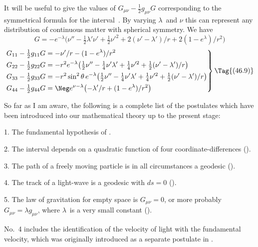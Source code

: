 \documentclass[12pt]{book}
\begin{document}
It will be useful to give the values of $G_{\mu\nu} - \frac{1}{2} g_{\mu\nu} G$ corresponding to the
symmetrical formula for the interval~. By varying $\lambda$~and $\nu$ this can represent
any distribution of continuous matter with spherical symmetry. We have
\[
G = -e^{-\lambda} \bigl(\nu'' - \tfrac{1}{2}\lambda'\nu' + \tfrac{1}{2}\nu'^{2} + 2(\nu' - \lambda')/r + 2(1 - e^{\lambda})/r^{2}\bigr)
\]
\[\left.
\begin{aligned}
  &G_{11} - \tfrac{1}{2} g_{11} G
  = -\nu'/r - (1 - e^{\lambda})/r^{2}\\
  &G_{22} - \tfrac{1}{2} g_{22} G
 = -r^{2} e^{-\lambda} \bigl(\tfrac{1}{2}\nu'' - \tfrac{1}{4}\nu'\lambda' + \tfrac{1}{4}\nu'^{2} + \tfrac{1}{2}(\nu' - \lambda')/r\bigr)\\
  &G_{33} - \tfrac{1}{2} g_{33} G
 = -r^{2}\sin^{2}\theta\, e^{-\lambda} \bigl(\tfrac{1}{2}\nu'' - \tfrac{1}{4}\nu'\lambda' + \tfrac{1}{4}\nu'^{2} + \tfrac{1}{2}(\nu' - \lambda')/r\bigr)\\
  &G_{44} - \tfrac{1}{2} g_{44} G
  = \Neg e^{\nu-\lambda} \bigl(-\lambda'/r + (1 - e^{\lambda})/r^{2}\bigr)
\end{aligned}
\right\}
\Tag{(46.9)}
\]

%

So far as I am aware, the following is a complete list of the postulates
which have been introduced into our mathematical theory up to the present
stage:

1. The fundamental hypothesis of .

2. The interval depends on a quadratic function of four coordinate-differences
().

3. The path of a freely moving particle is in all circumstances a geodesic
().

4. The track of a light-wave is a geodesic with $ds = 0$ ().

5. The law of gravitation for empty space is $G_{\mu\nu} = 0$, or more probably
$G_{\mu\nu} = \lambda g_{\mu\nu}$, where $\lambda$~is a very small constant ().

No.~4 includes the identification of the velocity of light with the fundamental
velocity, which was originally introduced as a separate postulate in .
\end{document}
